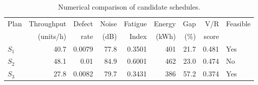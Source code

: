 \begin{table}[htbp]
\centering
\caption{Numerical comparison of candidate schedules.}
\label{tab:numerical-sim}
\small
\begin{tabular}{@{}lrrrrrrrl@{}}
\toprule
Plan & Throughput & Defect & Noise & Fatigue & Energy & Gap & V/R & Feasible \\
     & (units/h)  & rate   & (dB)  & Index   & (kWh)  & (\%) & score &         \\
\midrule
$S_{1}$ & 40.7 & 0.0079 & 77.8 & 0.3501 & 401 & 21.7 & 0.481 & Yes \\
$S_{2}$ & 48.1 & 0.01 & 84.9 & 0.6001 & 462 & 23.0 & 0.474 & No \\
$S_{3}$ & 27.8 & 0.0082 & 79.7 & 0.3431 & 386 & 57.2 & 0.374 & Yes \\
\bottomrule
\end{tabular}
\end{table}
